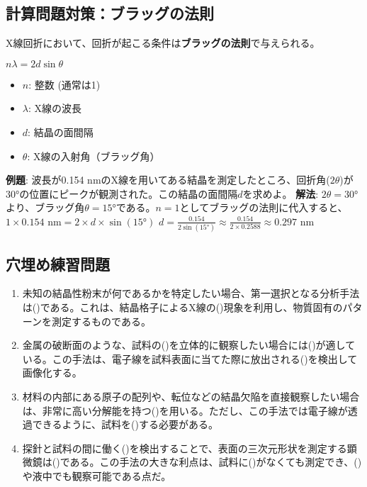 \documentclass[11pt,a4paper]{ltjsarticle}
\newcommand{\blank}[1][3cm]{\underline{\hspace{#1}}}
\begin{document}
\subsection{計算問題対策：ブラッグの法則}
X線回折において、回折が起こる条件は\textbf{ブラッグの法則}で与えられる。
\begin{tcolorbox}[colback=blue!5!white,colframe=blue!75!black,title=ブラッグの法則]
$n\lambda = 2d\sin\theta$
\end{tcolorbox}
\begin{itemize}
    \item $n$: 整数 (通常は1)
    \item $\lambda$: X線の波長
    \item $d$: 結晶の面間隔
    \item $\theta$: X線の入射角（ブラッグ角）
\end{itemize}
\textbf{例題}: 波長が0.154 nmのX線を用いてある結晶を測定したところ、回折角($2\theta$)が30°の位置にピークが観測された。この結晶の面間隔$d$を求めよ。
\textbf{解法}: $2\theta = 30°$より、ブラッグ角$\theta = 15°$である。$n=1$としてブラッグの法則に代入すると、
$1 \times 0.154\text{ nm} = 2 \times d \times \sin(15°)$
$d = \frac{0.154}{2 \sin(15°)} \approx \frac{0.154}{2 \times 0.2588} \approx 0.297\text{ nm}$

\subsection{穴埋め練習問題}
\begin{enumerate}
    \item 未知の結晶性粉末が何であるかを特定したい場合、第一選択となる分析手法は(\blank)である。これは、結晶格子によるX線の(\blank)現象を利用し、物質固有のパターンを測定するものである。
    \item 金属の破断面のような、試料の(\blank[2.5cm])を立体的に観察したい場合には(\blank[1.5cm])が適している。この手法は、電子線を試料表面に当てた際に放出される(\blank[2.5cm])を検出して画像化する。
    \item 材料の内部にある原子の配列や、転位などの結晶欠陥を直接観察したい場合は、非常に高い分解能を持つ(\blank[1.5cm])を用いる。ただし、この手法では電子線が透過できるように、試料を(\blank[2.5cm])する必要がある。
    \item 探針と試料の間に働く(\blank[2.5cm])を検出することで、表面の三次元形状を測定する顕微鏡は(\blank)である。この手法の大きな利点は、試料に(\blank[2.5cm])がなくても測定でき、(\blank[2.5cm])や液中でも観察可能である点だ。
\end{enumerate}
\end{document}
